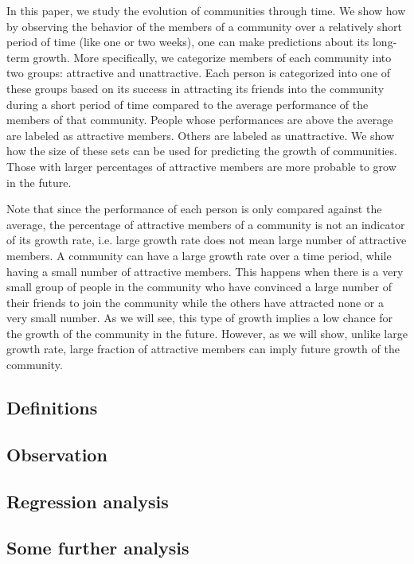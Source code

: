 In this paper, we study the evolution of communities through time. We show how by observing the behavior of the members of a community over a relatively short period of time (like one or two weeks), one can make predictions about its long-term growth. More specifically, we categorize members of each community into two groups: attractive and unattractive. Each person is categorized into one of these groups based on its success in attracting its friends into the community during a short period of time compared to the average performance of the members of that community. People whose performances are above the average are labeled as attractive members. Others are labeled as unattractive. We show how the size of these sets can be used for predicting the growth of communities. Those with larger percentages of attractive members are more probable to grow in the future. 

Note that since the performance of each person is only compared against the average,  the percentage of attractive members of a community is not an indicator of its growth rate, i.e. large growth rate does not mean large number of attractive members. A community can have a large growth rate over a time period, while having a small number of attractive members. This happens when there is a very small group of people in the community who have convinced a large number  of their friends to join the community while the others have attracted none or a very small number. As we will see, this type of growth implies a low chance for the growth of the community in the future. However, as we will show, unlike large growth rate, large fraction of attractive members can imply future growth of the community.


\subsection{Definitions} \label{sec: definitions}


\subsection{Observation} \label{sec: initial}



\subsection{Regression analysis}\label{sec: regression}


\subsection{Some further analysis}

